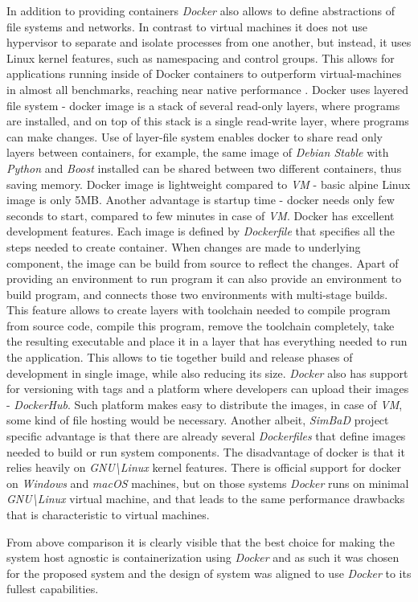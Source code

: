 In addition to providing containers \textit{Docker} also allows to define abstractions of file systems and networks. In contrast to virtual machines it does not use hypervisor to separate and isolate processes from one another, but instead, it uses Linux kernel features, such as namespacing and control groups. This allows for applications running inside of Docker containers to outperform virtual-machines in almost all benchmarks, reaching near native performance \cite{Felter2015}. Docker uses layered file system - docker image is a stack of several read-only layers, where programs are installed, and on top of this stack is a single read-write layer, where programs can make changes. Use of layer-file system enables docker to share read only layers between containers, for example, the same image of \textit{Debian Stable} with \textit{Python} and \textit{Boost} installed can be shared between two different containers, thus saving memory. Docker image is lightweight compared to \textit{VM} - basic alpine Linux image is only 5MB. Another advantage is startup time - docker needs only few seconds to start, compared to few minutes in case of \textit{VM}. 
Docker has excellent development features. Each image is defined by \textit{Dockerfile} that specifies all the steps needed to create container. When changes are made to underlying component, the image can be build from source to reflect the changes. Apart of providing an environment to run program it can also provide an environment to build program, and connects those two environments with multi-stage builds. This feature allows to create layers with toolchain needed to compile program from source code, compile this program, remove the toolchain completely, take the resulting executable and place it in a layer that has everything needed to run the application. This allows to tie together build and release phases of development in single image, while also reducing its size. \textit{Docker} also has support for versioning with tags and a platform where developers can upload their images - \textit{DockerHub}. Such platform makes easy to distribute the images, in case of \textit{VM}, some kind of file hosting would be necessary. Another albeit, \textit{SimBaD} project specific advantage is that there are already several \textit{Dockerfiles} that define images needed to build or run system components.
The disadvantage of docker is that it relies heavily on \textit{GNU\textbackslash Linux} kernel features. There is official support for docker on \textit{Windows} and \textit{macOS} machines, but on those systems \textit{Docker} runs on minimal \textit{GNU\textbackslash Linux} virtual machine, and that leads to the same performance drawbacks that is characteristic to virtual machines. 

From above comparison it is clearly visible that the best choice for making the system host agnostic is containerization using \textit{Docker} and as such it was chosen for the proposed system and the design of system was aligned to use \textit{Docker} to its fullest capabilities.

